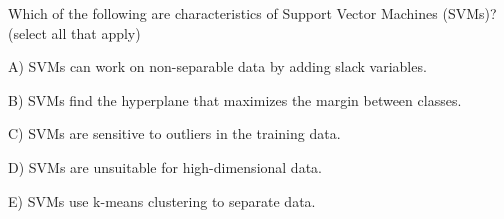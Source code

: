 Which of the following are characteristics of Support Vector Machines (SVMs)? (select all that apply)


A) SVMs can work on non-separable data by adding slack variables.


B) SVMs find the hyperplane that maximizes the margin between classes.


C) SVMs are sensitive to outliers in the training data.


D) SVMs are unsuitable for high-dimensional data.


E) SVMs use k-means clustering to separate data.

